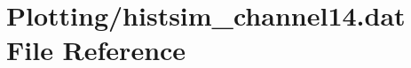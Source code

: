 \hypertarget{Plotting_2histsim__channel14_8dat}{}\section{Plotting/histsim\+\_\+channel14.dat File Reference}
\label{Plotting_2histsim__channel14_8dat}
